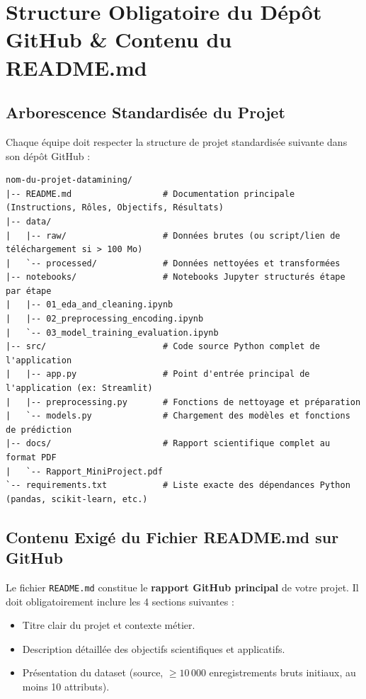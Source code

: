 \documentclass[11pt,a4paper]{article}
\begin{document}
\section{Structure Obligatoire du Dépôt GitHub \& Contenu du README.md}

\subsection{Arborescence Standardisée du Projet}
Chaque équipe doit respecter la structure de projet standardisée suivante dans son dépôt GitHub :

\begin{verbatim}
nom-du-projet-datamining/
|-- README.md                  # Documentation principale (Instructions, Rôles, Objectifs, Résultats)
|-- data/
|   |-- raw/                   # Données brutes (ou script/lien de téléchargement si > 100 Mo)
|   `-- processed/             # Données nettoyées et transformées
|-- notebooks/                 # Notebooks Jupyter structurés étape par étape
|   |-- 01_eda_and_cleaning.ipynb
|   |-- 02_preprocessing_encoding.ipynb
|   `-- 03_model_training_evaluation.ipynb
|-- src/                       # Code source Python complet de l'application
|   |-- app.py                 # Point d'entrée principal de l'application (ex: Streamlit)
|   |-- preprocessing.py       # Fonctions de nettoyage et préparation
|   `-- models.py              # Chargement des modèles et fonctions de prédiction
|-- docs/                      # Rapport scientifique complet au format PDF
|   `-- Rapport_MiniProject.pdf
`-- requirements.txt           # Liste exacte des dépendances Python (pandas, scikit-learn, etc.)
\end{verbatim}

\subsection{Contenu Exigé du Fichier README.md sur GitHub}
Le fichier \texttt{README.md} constitue le \textbf{rapport GitHub principal} de votre projet. Il doit obligatoirement inclure les 4 sections suivantes :

\begin{tcolorbox}[colback=lightgray, colframe=sintefblue, title=\textbf{SECTION 1 : Présentation, Objectifs et Description du Projet}, arc=2mm]
    \begin{itemize}
        \item Titre clair du projet et contexte métier.
        \item Description détaillée des objectifs scientifiques et applicatifs.
        \item Présentation du dataset (source, $\ge 10\,000$ enregistrements bruts initiaux, au moins 10 attributs).
    \end{itemize}
\end{tcolorbox}
\end{document}
